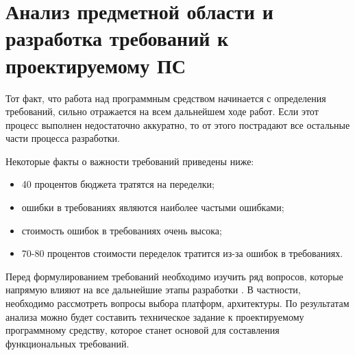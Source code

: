 \section{Анализ предметной области и разработка требований к проектируемому ПС}
\label{sec:analysis}

Тот факт, что работа над программным средством начинается с определения требований, сильно отражается на всем дальнейшем ходе работ. Если этот процесс выполнен недостаточно аккуратно, то от этого пострадают все остальные части процесса разработки.

Некоторые факты о важности требований приведены ниже:
\begin{itemize}
	\item 40 процентов бюджета тратятся на переделки;
	\item ошибки в требованиях являются наиболее частыми ошибками;
	\item стоимость ошибок в требованиях очень высока;
	\item 70-80 процентов стоимости переделок тратится из-за ошибок в требованиях.
\end{itemize}

Перед формулированием требований необходимо изучить ряд вопросов, которые напрямую влияют на все дальнейшие этапы разработки \cite{software_cost_estimation}. В частности, необходимо рассмотреть вопросы выбора платформ, архитектуры. По результатам анализа можно будет составить техническое задание к проектируемому программному средству, которое станет основой для составления функциональных требований.





